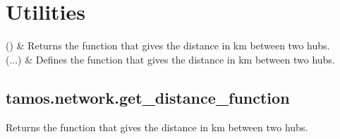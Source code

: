 \documentclass[letterpaper,10pt,english]{sphinxmanual}
\begin{document}
\section{Utilities}
\label{\detokenize{network_components:utilities}}

\begin{savenotes}\sphinxattablestart
\centering
\begin{tabulary}{\linewidth}[t]{}
\hline

\sphinxAtStartPar
{\hyperref[\detokenize{generated/tamos.network.get_distance_function:tamos.network.get_distance_function}]{}}()
&
\sphinxAtStartPar
Returns the function that gives the distance in km between two hubs.
\\
\hline
\sphinxAtStartPar
{\hyperref[\detokenize{generated/tamos.network.set_distance_function:tamos.network.set_distance_function}]{}}(...)
&
\sphinxAtStartPar
Defines the function that gives the distance in km between two hubs.
\\
\hline
\end{tabulary}
\par
\sphinxattableend\end{savenotes}

\sphinxstepscope


\subsection{tamos.network.get\_distance\_function}
\label{\detokenize{generated/tamos.network.get_distance_function:tamos-network-get-distance-function}}\label{\detokenize{generated/tamos.network.get_distance_function::doc}}

\begin{fulllineitems}
\label{\detokenize{generated/tamos.network.get_distance_function:tamos.network.get_distance_function}}
\pysigstartsignatures
{}
\pysigstopsignatures
\sphinxAtStartPar
Returns the function that gives the distance in km between two hubs.

\end{fulllineitems}
\end{document}
